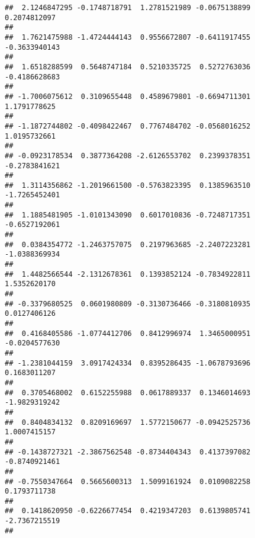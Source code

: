 \documentclass[]{article}
\begin{document}
\begin{verbatim}
##  2.1246847295 -0.1748718791  1.2781521989 -0.0675138899  0.2074812097 
##                                                                       
##  1.7621475988 -1.4724444143  0.9556672807 -0.6411917455 -0.3633940143 
##                                                                       
##  1.6518288599  0.5648747184  0.5210335725  0.5272763036 -0.4186628683 
##                                                                       
## -1.7006075612  0.3109655448  0.4589679801 -0.6694711301  1.1791778625 
##                                                                       
## -1.1872744802 -0.4098422467  0.7767484702 -0.0568016252  1.0195732661 
##                                                                       
## -0.0923178534  0.3877364208 -2.6126553702  0.2399378351 -0.2783841621 
##                                                                       
##  1.3114356862 -1.2019661500 -0.5763823395  0.1385963510 -1.7265452401 
##                                                                       
##  1.1885481905 -1.0101343090  0.6017010836 -0.7248717351 -0.6527192061 
##                                                                       
##  0.0384354772 -1.2463757075  0.2197963685 -2.2407223281 -1.0388369934 
##                                                                       
##  1.4482566544 -2.1312678361  0.1393852124 -0.7834922811  1.5352620170 
##                                                                       
## -0.3379680525  0.0601980809 -0.3130736466 -0.3180810935  0.0127406126 
##                                                                       
##  0.4168405586 -1.0774412706  0.8412996974  1.3465000951 -0.0204577630 
##                                                                       
## -1.2381044159  3.0917424334  0.8395286435 -1.0678793696  0.1683011207 
##                                                                       
##  0.3705468002  0.6152255988  0.0617889337  0.1346014693 -1.9829319242 
##                                                                       
##  0.8404834132  0.8209169697  1.5772150677 -0.0942525736  1.0007415157 
##                                                                       
## -0.1438727321 -2.3867562548 -0.8734404343  0.4137397082 -0.8740921461 
##                                                                       
## -0.7550347664  0.5665600313  1.5099161924  0.0109082258  0.1793711738 
##                                                                       
##  0.1418620950 -0.6226677454  0.4219347203  0.6139805741 -2.7367215519 
##                                                                       

\end{verbatim}
\end{document}
